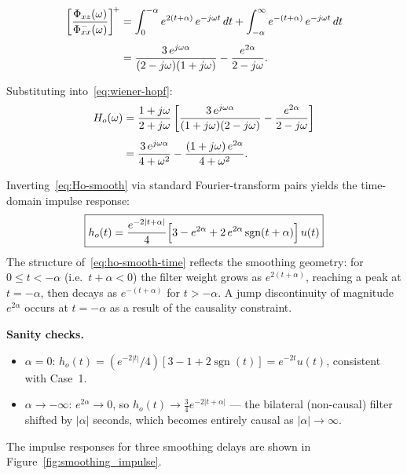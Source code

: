 \documentclass[12pt]{book}
\theoremstyle{definition}
\begin{document}
\begin{align}
  \left[\frac{\Phi_{xz}(\omega)}{\Phi_{xx}^{-}(\omega)}\right]^{\!+}
  &= \int_0^{-\alpha}e^{2(t+\alpha)}\,e^{-j\omega t}\,dt
   + \int_{-\alpha}^{\infty}e^{-(t+\alpha)}\,e^{-j\omega t}\,dt \notag\\[4pt]
  &= \frac{3\,e^{j\omega\alpha}}{(2-j\omega)(1+j\omega)}
   - \frac{e^{2\alpha}}{2-j\omega}.
   \label{eq:causal-part-smooth}
\end{align}

Substituting into~\eqref{eq:wiener-hopf}:
\begin{align}
  H_o(\omega)
  &= \frac{1+j\omega}{2+j\omega}\left[
       \frac{3\,e^{j\omega\alpha}}{(1+j\omega)(2-j\omega)}
      -\frac{e^{2\alpha}}{2-j\omega}\right] \notag\\[4pt]
  &= \frac{3\,e^{j\omega\alpha}}{4+\omega^2}
   - \frac{(1+j\omega)\,e^{2\alpha}}{4+\omega^2}.
   \label{eq:Ho-smooth}
\end{align}

Inverting~\eqref{eq:Ho-smooth} via standard Fourier-transform pairs yields the
time-domain impulse response:
\begin{equation}
  \boxed{h_o(t)
    = \frac{e^{-2|t+\alpha|}}{4}
      \Bigl[3 - e^{2\alpha} + 2\,e^{2\alpha}\operatorname{sgn}(t+\alpha)\Bigr]\,u(t)}
  \label{eq:ho-smooth-time}
\end{equation}
The structure of~\eqref{eq:ho-smooth-time} reflects the smoothing geometry:
for $0\le t < -\alpha$ (i.e.\ $t+\alpha<0$) the filter weight grows as
$e^{2(t+\alpha)}$, reaching a peak at $t=-\alpha$, then decays as
$e^{-(t+\alpha)}$ for $t>-\alpha$.  A jump discontinuity of magnitude
$e^{2\alpha}$ occurs at $t=-\alpha$ as a result of the causality constraint.

\medskip\noindent
\textbf{Sanity checks.}
\begin{itemize}
  \item $\alpha=0$: $h_o(t)=(e^{-2|t|}/4)[3-1+2\operatorname{sgn}(t)]
        = e^{-2t}u(t)$, consistent with Case~1. \checkmark
  \item $\alpha\to-\infty$: $e^{2\alpha}\to 0$, so
        $h_o(t)\to\tfrac{3}{4}e^{-2|t+\alpha|}$ — the bilateral
        (non-causal) filter shifted by $|\alpha|$ seconds, which becomes
        entirely causal as $|\alpha|\to\infty$. \checkmark
\end{itemize}

The impulse responses for three smoothing delays are shown in
Figure~\ref{fig:smoothing_impulse}.
\end{document}
